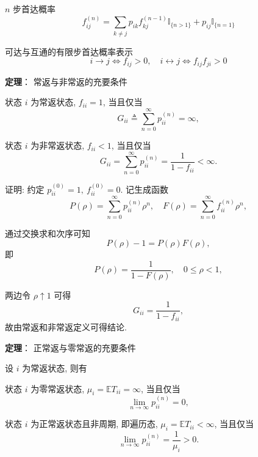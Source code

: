 \documentclass[openany]{ctexbook}
\theoremstyle{kaiti}
\theoremstyle{normal}
\begin{document}
$n$ 步首达概率
\begin{equation}
  f_{ij}^{(n)}=\sum_{k\neq j}p_{ik}f_{kj}^{(n-1)}\mathbb{I}_{\{n>1\}}+p_{ij}\mathbb{I}_{\{n=1\}}
\end{equation}

可达与互通的有限步首达概率表示
\begin{equation}
  i\to j\Leftrightarrow f_{ij}>0,\quad i\leftrightarrow j\Leftrightarrow f_{ij}f_{ji}>0
\end{equation}

\textbf{定理}： 常返与非常返的充要条件

状态 $i$ 为常返状态, $f_{ii}=1$, 当且仅当
\begin{equation}
  G_{ii}\triangleq\sum_{n=0}^\infty p_{ii}^{(n)}=\infty,
\end{equation}

状态 $i$ 为非常返状态, $f_{ii}<1$, 当且仅当
\begin{equation}
  G_{ii}=\sum_{n=0}^\infty p_{ii}^{(n)}=\frac{1}{1-f_{ii}}<\infty.
\end{equation}

证明: 约定 $p_{ii}^{(0)}=1,~f_{ii}^{(0)}=0$. 记生成函数
\begin{equation}
  P(\rho)=\sum_{n=0}^\infty p_{ii}^{(n)}\rho^n,\quad F(\rho)=\sum_{n=0}^\infty f_{ii}^{(n)}\rho^n,
\end{equation}

通过交换求和次序可知
\begin{equation}
  P(\rho)-1=P(\rho)F(\rho),
\end{equation}
即
\begin{equation}
  P(\rho)=\frac{1}{1-F(\rho)},\quad0\leqslant\rho<1,
\end{equation}

两边令 $\rho\uparrow1$ 可得
\begin{equation}
  G_{ii}=\frac{1}{1-f_{ii}},
\end{equation}
故由常返和非常返定义可得结论.

\textbf{定理}： 正常返与零常返的充要条件

设 $i$ 为常返状态, 则有

状态 $i$ 为零常返状态, $\mu_i=\mathbb{E}T_{ii}=\infty$, 当且仅当
\begin{equation}
  \lim_{n\to\infty} p_{ii}^{(n)}=0,
\end{equation}

状态 $i$ 为正常返状态且非周期, 即遍历态, $\mu_i=\mathbb{E}T_{ii}<\infty$, 当且仅当
\begin{equation}
  \lim_{n\to\infty} p_{ii}^{(n)}=\frac{1}{\mu_i}>0.
\end{equation}
\end{document}
